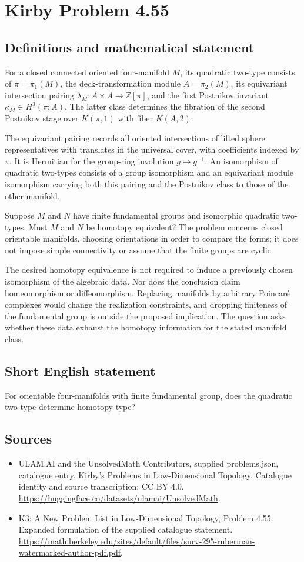 \documentclass[11pt,a4paper]{article}
\begin{document}
\section*{Kirby Problem 4.55}\label{statement}

\subsection{Definitions and mathematical statement}
For a closed connected oriented four-manifold $M$, its quadratic two-type consists of $\pi=\pi_1(M)$, the deck-transformation module $A=\pi_2(M)$, its equivariant intersection pairing $\lambda_M:A\times A\to\mathbb Z[\pi]$, and the first Postnikov invariant $\kappa_M\in H^3(\pi;A)$. The latter class determines the fibration of the second Postnikov stage over $K(\pi,1)$ with fiber $K(A,2)$.

The equivariant pairing records all oriented intersections of lifted sphere representatives with translates in the universal cover, with coefficients indexed by $\pi$. It is Hermitian for the group-ring involution $g\mapsto g^{-1}$. An isomorphism of quadratic two-types consists of a group isomorphism and an equivariant module isomorphism carrying both this pairing and the Postnikov class to those of the other manifold.

Suppose $M$ and $N$ have finite fundamental groups and isomorphic quadratic two-types. Must $M$ and $N$ be homotopy equivalent? The problem concerns closed orientable manifolds, choosing orientations in order to compare the forms; it does not impose simple connectivity or assume that the finite groups are cyclic.

The desired homotopy equivalence is not required to induce a previously chosen isomorphism of the algebraic data. Nor does the conclusion claim homeomorphism or diffeomorphism. Replacing manifolds by arbitrary Poincaré complexes would change the realization constraints, and dropping finiteness of the fundamental group is outside the proposed implication. The question asks whether these data exhaust the homotopy information for the stated manifold class.
\subsection{Short English statement}
For orientable four-manifolds with finite fundamental group, does the quadratic two-type determine homotopy type?
\subsection{Sources}
\begin{itemize}
\item[S1] ULAM.AI and the UnsolvedMath Contributors, supplied problems.json, catalogue entry, Kirby's Problems in Low-Dimensional Topology. Catalogue identity and source transcription; CC BY 4.0.
\url{https://huggingface.co/datasets/ulamai/UnsolvedMath}.
\item[S2] K3: A New Problem List in Low-Dimensional Topology, Problem 4.55. Expanded formulation of the supplied catalogue statement.
\url{https://math.berkeley.edu/sites/default/files/surv-295-ruberman-watermarked-author-pdf.pdf}.
\end{itemize}
\end{document}
